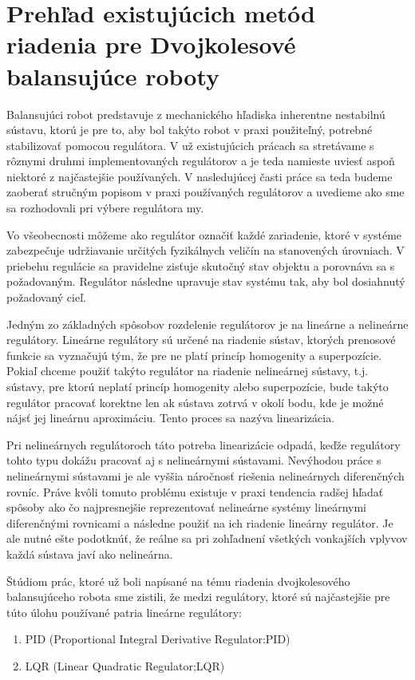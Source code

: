 \chapter{Prehľad existujúcich	metód riadenia pre	Dvojkolesové balansujúce roboty}


Balansujúci robot predstavuje z mechanického hľadiska inherentne nestabilnú sústavu, ktorú je pre to, aby bol takýto robot v praxi použiteľný, potrebné stabilizovať pomocou regulátora. V už existujúcich prácach sa stretávame s rôznymi druhmi implementovaných regulátorov a je teda namieste uviesť aspoň niektoré z najčastejšie používaných. V nasledujúcej časti práce sa teda budeme zaoberať  stručným popisom v praxi používaných regulátorov a uvedieme ako sme sa rozhodovali pri výbere regulátora my.

Vo všeobecnosti môžeme ako regulátor označiť každé zariadenie, ktoré v systéme zabezpečuje udržiavanie určitých fyzikálnych veličín na stanovených úrovniach. V priebehu regulácie sa pravidelne zisťuje skutočný stav objektu a porovnáva sa s požadovaným.  Regulátor následne upravuje stav systému tak, aby bol dosiahnutý požadovaný cieľ.

Jedným zo základných spôsobov rozdelenie regulátorov je na lineárne a nelineárne regulátory. Lineárne regulátory sú určené na riadenie sústav, ktorých prenosové funkcie sa vyznačujú tým, že pre ne platí princíp homogenity a superpozície. Pokiaľ chceme použiť takýto regulátor na riadenie nelineárnej sústavy, t.j. sústavy, pre ktorú neplatí princíp homogenity alebo superpozície, bude takýto regulátor pracovať korektne len ak sústava zotrvá v okolí bodu, kde je možné nájsť jej lineárnu aproximáciu. Tento proces sa nazýva linearizácia. 

Pri nelineárnych regulátoroch táto potreba linearizácie odpadá, keďže regulátory tohto typu dokážu pracovať aj s nelineárnymi sústavami. Nevýhodou práce s nelineárnymi sústavami je ale vyššia náročnosť riešenia nelineárnych diferenčných rovníc. Práve kvôli  tomuto problému existuje v praxi tendencia radšej hľadať spôsoby ako čo najpresnejšie reprezentovať nelineárne systémy lineárnymi diferenčnými rovnicami a následne použiť na ich riadenie lineárny regulátor. Je ale nutné ešte podotknúť, že reálne sa pri zohľadnení všetkých vonkajších vplyvov každá sústava javí ako nelineárna. 

Štúdiom prác, ktoré už boli napísané na tému riadenia dvojkolesového balansujúceho robota sme zistili, že medzi regulátory, ktoré sú najčastejšie pre túto úlohu používané patria lineárne regulátory:
\begin{enumerate}
\item PID (Proportional Integral Derivative Regulator:PID)
\item LQR  (Linear Quadratic Regulator;LQR)
\end{enumerate}

